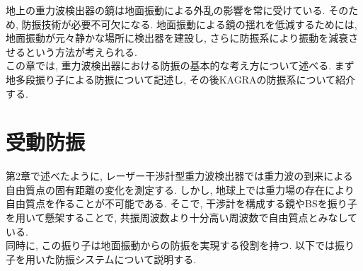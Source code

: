 地上の重力波検出器の鏡は地面振動による外乱の影響を常に受けている. そのため, 防振技術が必要不可欠になる. 地面振動による鏡の揺れを低減するためには, 地面振動が元々静かな場所に検出器を建設し, さらに防振系により振動を減衰させるという方法が考えられる. \\
\quad この章では, 重力波検出器における防振の基本的な考え方について述べる. まず地多段振り子による防振について記述し, その後KAGRAの防振系について紹介する. 

\section{受動防振}
\label{sec3.1}
第2章で述べたように, レーザー干渉計型重力波検出器では重力波の到来による自由質点の固有距離の変化を測定する. しかし, 地球上では重力場の存在により自由質点を作ることが不可能である. そこで, 干渉計を構成する鏡やBSを振り子を用いて懸架することで, 共振周波数より十分高い周波数で自由質点とみなしている. \\
\quad 同時に, この振り子は地面振動からの防振を実現する役割を持つ. 以下では振り子を用いた防振システムについて説明する. 
